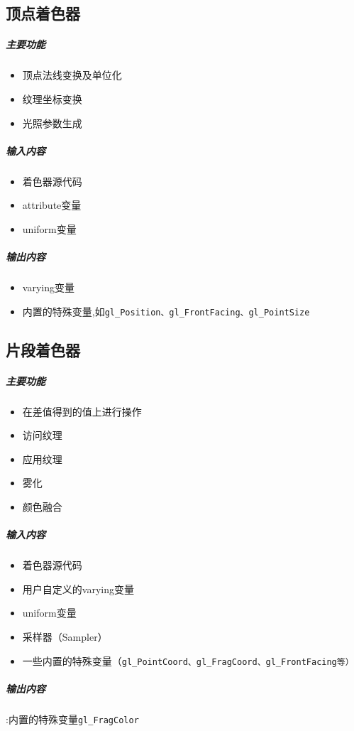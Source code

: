 \documentclass[UTF8,a4paper,12pt]{ctexbook}
\begin{document}
		\subsection{顶点着色器}
			\subparagraph{主要功能}
				\begin{itemize}[itemindent = 1em]
					\item 顶点法线变换及单位化
					\item 纹理坐标变换
					\item 光照参数生成
				\end{itemize}
			\subparagraph{输入内容}
				\begin{itemize}[itemindent = 1em]
					\item 着色器源代码
					\item attribute变量
					\item uniform变量
				\end{itemize}
			\subparagraph{输出内容}
				\begin{itemize}[itemindent = 1em]
					\item varying变量
					\item 内置的特殊变量,如\verb|gl_Position、gl_FrontFacing、gl_PointSize|
				\end{itemize}
		\subsection{片段着色器}
			\subparagraph{主要功能}
				\begin{itemize}[itemindent = 1em]
					\item 在差值得到的值上进行操作
					\item 访问纹理
					\item 应用纹理
					\item 雾化
					\item 颜色融合
				\end{itemize}
			\subparagraph{输入内容}
				\begin{itemize}[itemindent = 1em]
					\item 着色器源代码
					\item 用户自定义的varying变量
					\item uniform变量
					\item 采样器（Sampler）
					\item 一些内置的特殊变量（\verb|gl_PointCoord、gl_FragCoord、gl_FrontFacing等）|	
				\end{itemize}
			\subparagraph{输出内容}:内置的特殊变量\verb|gl_FragColor|
			
\end{document}
